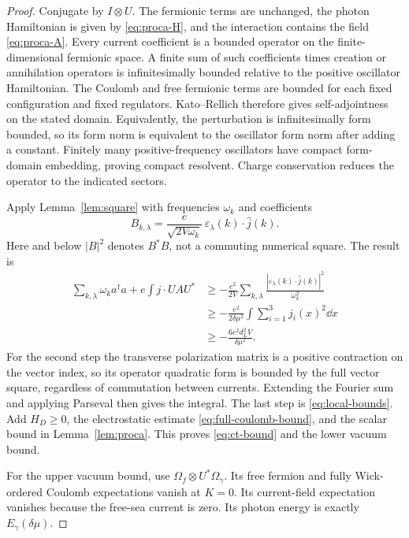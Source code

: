 \begin{proof}
Conjugate by \(I\otimes U\). The fermionic terms are unchanged, the
photon Hamiltonian is given by \eqref{eq:proca-H}, and the interaction
contains the field \eqref{eq:proca-A}. Every current coefficient is a bounded
operator on the finite-dimensional fermionic space. A finite sum of such
coefficients times creation or annihilation operators is infinitesimally
bounded relative to the positive oscillator Hamiltonian. The Coulomb and
free fermionic terms are bounded for each fixed configuration and fixed
regulators. Kato--Rellich therefore gives self-adjointness on the stated
domain. Equivalently, the perturbation is infinitesimally form bounded,
so its form norm is equivalent to the oscillator form norm after adding a
constant. Finitely many positive-frequency oscillators have compact
form-domain embedding, proving compact resolvent. Charge conservation
reduces the operator to the indicated sectors.

Apply Lemma~\ref{lem:square} with frequencies \(\omega_k\) and coefficients
\[
 B_{k,\lambda}=
 \frac{e}{\sqrt{2V\omega_k}}\,
 \varepsilon_\lambda(k)\cdot\widehat j(k).
\]
Here and below \(|B|^2\) denotes \(B^*B\), not a commuting numerical square.
The result is
\begin{align*}
 \sum_{k,\lambda}\omega_k a^\dagger a
       +e\int j\cdot UAU^*
 &\geq-\frac{e^2}{2V}\sum_{k,\lambda}
       \frac{|\varepsilon_\lambda(k)\cdot\widehat j(k)|^2}{\omega_k^2}\\
 &\geq-\frac{e^2}{2\delta\mu^2}
             \int\sum_{i=1}^3j_i(x)^2\dd x\\
 &\geq-\frac{6e^2d_L^2V}{\delta\mu^2}.
\end{align*}
For the second step the transverse polarization matrix is a positive
contraction on the vector index, so its operator quadratic form is bounded
by the full vector square, regardless of commutation between currents.
Extending the Fourier sum and applying Parseval then gives the integral.
The last step is \eqref{eq:local-bounds}. Add \(H_D\geq0\), the
electrostatic estimate \eqref{eq:full-coulomb-bound}, and the scalar bound
in Lemma~\ref{lem:proca}. This proves \eqref{eq:ct-bound} and the lower
vacuum bound.

For the upper vacuum bound, use
\(\Omega_f\otimes U^*\Omega_\gamma\). Its free fermion and fully
Wick-ordered Coulomb expectations vanish at \(K=0\). Its current-field
expectation vanishes because the free-sea current is zero. Its photon
energy is exactly \(E_\gamma(\delta\mu)\).
\end{proof}


